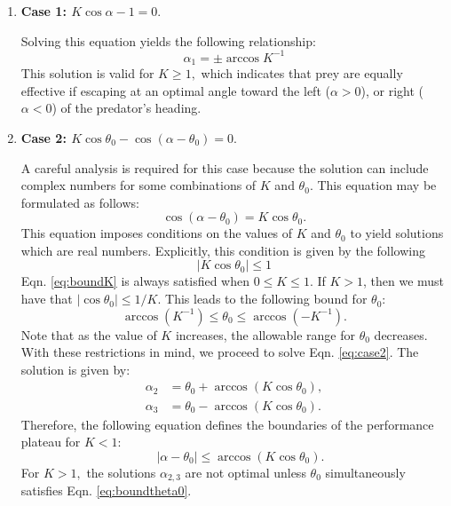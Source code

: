 \documentclass[12pt]{article}
\begin{document}
\begin{enumerate}
\item[]{\bf Case 1: $K \cos \alpha - 1 = 0.$} 

Solving this equation yields the following relationship:
\begin{equation}
\alpha_1 = \pm \arccos K^{-1}
\end{equation}
This solution is valid for $K\geq1,$ which indicates that prey are equally effective if escaping at an optimal angle toward the left ($\alpha>0$), or right ($\alpha<0$) of the predator's heading. 

\item[]{\bf Case 2: $K\cos \theta_0 - \cos(\alpha - \theta_0) = 0.$} 

A careful analysis is required for this case because the solution can include complex numbers for some combinations of $K$ and $\theta_0.$ 
This equation may be formulated as follows: 
%
\begin{equation}
\cos(\alpha - \theta_0) = K\cos \theta_0.
\label{eq:case2}
\end{equation}
%
This equation imposes conditions on the values of $K$ and $\theta_0$ to yield solutions which are real numbers. 
Explicitly, this condition is given by the following
%
\begin{equation}
 | K\cos \theta_0 | \leq 1
 \label{eq:boundK}
\end{equation}
%
Eqn. \ref{eq:boundK} is always satisfied when $0 \leq K \leq1$. If $K > 1$, then we must have that $| \cos \theta_0| \leq 1/K.$ This leads to the following bound for $\theta_0$:
%
\begin{equation}
\arccos (K^{-1}) \leq \theta_0 \leq \arccos (-K^{-1}).
\label{eq:boundtheta0}
\end{equation}
%
Note that as the value of $K$ increases, the allowable range for $\theta_0$ decreases. %
With these restrictions in mind, we proceed to solve Eqn. \ref{eq:case2}. The solution is given by:
%
\begin{align*}
\alpha_2 & = \theta_0 + \arccos(K \cos \theta_0), \\
\alpha_3 & = \theta_0 - \arccos(K \cos \theta_0).
\end{align*}
%
Therefore,  the following equation defines the boundaries of the performance plateau for $K<1:$ 
%
\begin{equation}
\quad |\alpha - \theta_0|  \leq    \arccos(K \cos  \theta_0).
 \end{equation}
%
For $K>1,$ the solutions $\alpha_{2,3}$ are not optimal unless $\theta_0$ simultaneously satisfies Eqn. \ref{eq:boundtheta0}. 


\end{enumerate}
\end{document}
